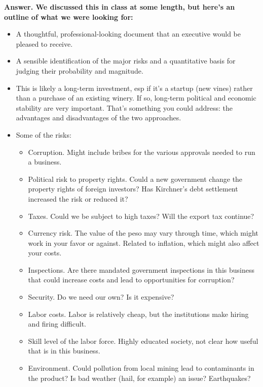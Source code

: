 \documentclass[letterpaper,12pt]{article}
\begin{document}
{\bf Answer.  We discussed this in class at some length, 
but here's an outline of what we were looking for:}
\begin{itemize}
\item A thoughtful, 
professional-looking document that an executive would be pleased to receive.  

\item A sensible identification of the major risks and 
a quantitative basis for judging their probability and magnitude.

\item This is likely a long-term investment, esp if it's a startup (new vines) rather than a purchase of an existing winery.  
If so, long-term  political and economic stability are very important. 
That's something you could address:  
the advantages and disadvantages of the two approaches. 

\item Some of the risks:  
\begin{itemize}
\item Corruption.  Might include bribes for the various approvals needed to 
run a business.  
\item Political risk to property rights.  
Could a new government change 
the property rights of foreign investors?  
Has Kirchner's debt settlement increased the risk or reduced it?  
\item Taxes.  Could we be subject to high taxes? 
Will the export tax continue?  
\item Currency risk.  The value of the peso may vary through time, 
which might work in your favor or against.  
Related to inflation, which might also affect your costs.  
\item Inspections.  Are there mandated government inspections
in this business that could increase costs and lead to 
opportunities for corruption?  
\item Security.  Do we need our own?  Is it expensive?  
\item Labor costs.  Labor is relatively cheap, but the institutions
make hiring and firing difficult.  
\item Skill level of the labor force.  
Highly educated society, not clear how useful that is in this business.  
\item Environment.  Could pollution from local mining 
lead to contaminants in the product?  
Is bad weather (hail, for example) an issue?  
Earthquakes?
\end{itemize}


\end{itemize}
\end{document}
